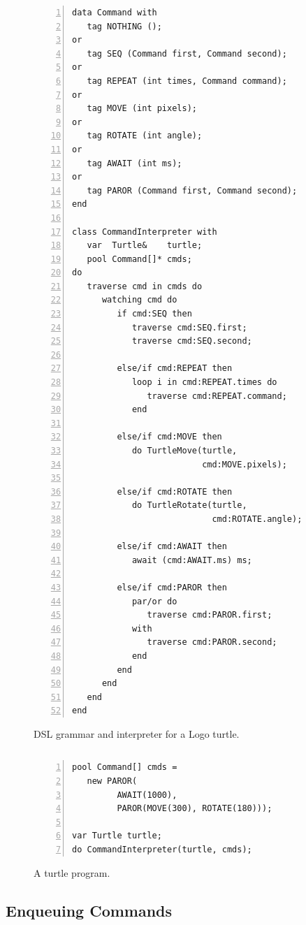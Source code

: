 \documentclass{sig-alternate}
\begin{document}
\begin{figure}[t]
\begin{lstlisting}[numbers=left,xleftmargin=3em]
data Command with
   tag NOTHING ();
or
   tag SEQ (Command first, Command second);
or
   tag REPEAT (int times, Command command);
or
   tag MOVE (int pixels);
or
   tag ROTATE (int angle);
or
   tag AWAIT (int ms);
or
   tag PAROR (Command first, Command second);
end

class CommandInterpreter with
   var  Turtle&    turtle;
   pool Command[]* cmds;
do
   traverse cmd in cmds do
      watching cmd do
         if cmd:SEQ then
            traverse cmd:SEQ.first;
            traverse cmd:SEQ.second;

         else/if cmd:REPEAT then
            loop i in cmd:REPEAT.times do
               traverse cmd:REPEAT.command;
            end

         else/if cmd:MOVE then
            do TurtleMove(turtle,
                          cmd:MOVE.pixels);

         else/if cmd:ROTATE then
            do TurtleRotate(turtle,
                            cmd:ROTATE.angle);

         else/if cmd:AWAIT then
            await (cmd:AWAIT.ms) ms;

         else/if cmd:PAROR then
            par/or do
               traverse cmd:PAROR.first;
            with
               traverse cmd:PAROR.second;
            end
         end
      end
   end
end
\end{lstlisting}
\caption{ DSL grammar and interpreter for a Logo turtle.
\label{lst.turtle}
}
\end{figure}

\begin{verbatim}
\end{verbatim}
\begin{figure}[t]
\begin{lstlisting}[numbers=left,xleftmargin=3em]
pool Command[] cmds =
   new PAROR(
         AWAIT(1000),
         PAROR(MOVE(300), ROTATE(180)));

var Turtle turtle;
do CommandInterpreter(turtle, cmds);
\end{lstlisting}
\caption{ A turtle program.
\label{lst.turtle.example}
}
\end{figure}

\subsection{Enqueuing Commands}
\label{sub.enqueuing}
\end{document}
